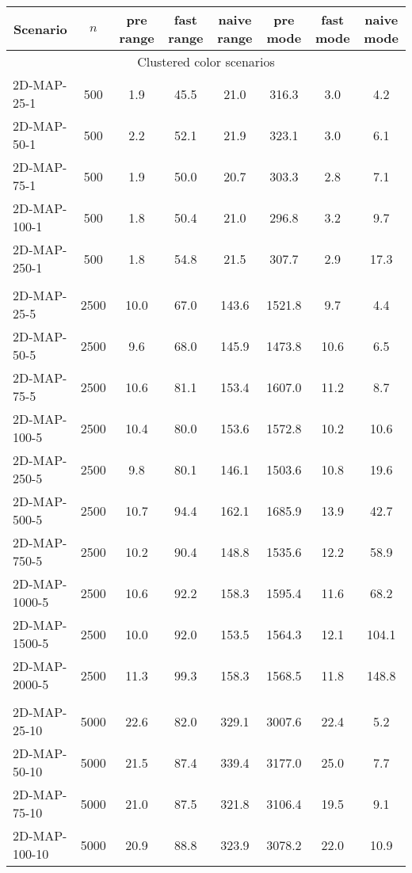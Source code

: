 \documentclass{article}
\begin{document}
\begin{center}    
\begin{table}[h]
    \hskip0.8cm
    \begin{tabular}{|l||c|c|c|c|c|c|c|}
    \hline
    \multicolumn{1}{|c|}{Scenario} & $n$ & pre range & fast range & naive range & pre mode & fast mode & naive mode  \\
    \hline
    \hline
    \multicolumn{8}{|c|}{Clustered color scenarios} \\
    \hline
    2D-MAP-25-1 & 500 & 1.9 & 45.5 & 21.0 & 316.3 & 3.0 & 4.2 \\
    2D-MAP-50-1 & 500 & 2.2 & 52.1 & 21.9 & 323.1 & 3.0 & 6.1 \\
    2D-MAP-75-1 & 500 & 1.9 & 50.0 & 20.7 & 303.3 & 2.8 & 7.1 \\
    2D-MAP-100-1 & 500 & 1.8 & 50.4 & 21.0 & 296.8 & 3.2 & 9.7 \\
    2D-MAP-250-1 & 500 & 1.8 & 54.8 & 21.5 & 307.7 & 2.9 & 17.3 \\
    \hline \\
    2D-MAP-25-5 & 2500 & 10.0 & 67.0 & 143.6 & 1521.8 & 9.7 & 4.4 \\
    2D-MAP-50-5 & 2500 & 9.6 & 68.0 & 145.9 & 1473.8 & 10.6 & 6.5 \\
    2D-MAP-75-5 & 2500 & 10.6 & 81.1 & 153.4 & 1607.0 & 11.2 & 8.7 \\
    2D-MAP-100-5 & 2500 & 10.4 & 80.0 & 153.6 & 1572.8 & 10.2 & 10.6 \\
    2D-MAP-250-5 & 2500 & 9.8 & 80.1 & 146.1 & 1503.6 & 10.8 & 19.6 \\
    2D-MAP-500-5 & 2500 & 10.7 & 94.4 & 162.1 & 1685.9 & 13.9 & 42.7 \\
    2D-MAP-750-5 & 2500 & 10.2 & 90.4 & 148.8 & 1535.6 & 12.2 & 58.9 \\
    2D-MAP-1000-5 & 2500 & 10.6 & 92.2 & 158.3 & 1595.4 & 11.6 & 68.2 \\
    2D-MAP-1500-5 & 2500 & 10.0 & 92.0 & 153.5 & 1564.3 & 12.1 & 104.1 \\
    2D-MAP-2000-5 & 2500 & 11.3 & 99.3 & 158.3 & 1568.5 & 11.8 & 148.8 \\
    \hline \\
    2D-MAP-25-10 & 5000 & 22.6 & 82.0 & 329.1 & 3007.6 & 22.4 & 5.2 \\
    2D-MAP-50-10 & 5000 & 21.5 & 87.4 & 339.4 & 3177.0 & 25.0 & 7.7 \\
    2D-MAP-75-10 & 5000 & 21.0 & 87.5 & 321.8 & 3106.4 & 19.5 & 9.1 \\
    2D-MAP-100-10 & 5000 & 20.9 & 88.8 & 323.9 & 3078.2 & 22.0 & 10.9 \\

\end{tabular}
\end{table}
\end{center}
\end{document}
